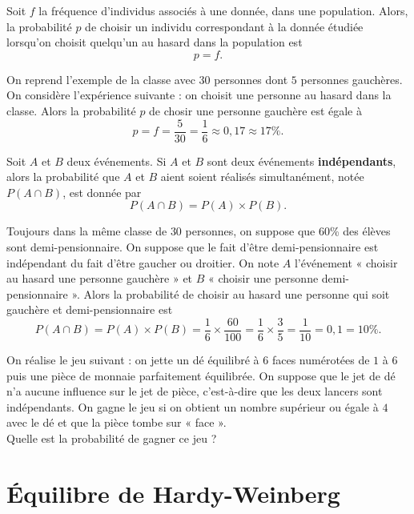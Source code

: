 \documentclass[11pt]{article}
\begin{document}
\begin{prop}
  Soit $f$ la fréquence d'individus associés à une donnée, dans une population.
  Alors, la probabilité $p$ de choisir un individu correspondant à la donnée
  étudiée lorsqu'on choisit quelqu'un au hasard dans la population est
  \[
    p = f.
  \]
\end{prop}
\begin{exemple}
  On reprend l'exemple de la classe avec $30$ personnes dont $5$ personnes
  gauchères. On considère l'expérience suivante : on choisit une personne au
  hasard dans la classe. Alors la probabilité $p$ de chosir une personne gauchère
  est égale à
  \[
    p=f=\frac{5}{30}=\frac{1}{6}\approx0,17\approx17\%.
  \]
\end{exemple}
\begin{prop}
  Soit $A$ et $B$ deux événements. Si $A$ et $B$ sont deux événements
  \textbf{indépendants}, alors la probabilité que $A$ et $B$ aient soient
  réalisés simultanément, notée $P(A\cap B)$, est donnée par
  \[
    P(A\cap B) = P(A)\times P(B).
  \]
\end{prop}
\begin{exemple}
  Toujours dans la même classe de $30$ personnes, on suppose que $60$\% des
  élèves sont demi-pensionnaire. On suppose que le fait d'être demi-pensionnaire
  est indépendant du fait d'être gaucher ou droitier. On note $A$ l'événement «
  choisir au hasard une personne gauchère » et $B$ « choisir une personne
  demi-pensionnaire ». Alors la probabilité de choisir au hasard une personne
  qui soit gauchère et demi-pensionnaire est
  \[
    P(A\cap B) = P(A)\times
    P(B)=\frac{1}{6}\times\frac{60}{100}=\frac{1}{6}\times\frac{3}{5}=\frac{1}{10}=0,1=10\%.
  \]
\end{exemple}
\begin{app}
  On réalise le jeu suivant : on jette un dé équilibré à $6$ faces
  numérotées de $1$ à $6$ puis une pièce de monnaie parfaitement équilibrée. On
  suppose que le jet de dé n'a aucune influence sur le jet de pièce,
  c'est-à-dire que les deux lancers sont indépendants. On
  gagne le jeu si on obtient un nombre supérieur ou égale à $4$ avec le dé et
  que la pièce tombe sur « face ».\\Quelle est la probabilité de gagner ce jeu ?
\end{app}

\section{Équilibre de Hardy-Weinberg}
\end{document}
